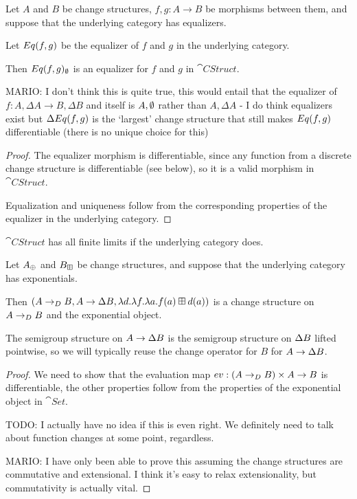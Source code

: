 \begin{prop}[Equalizers]
  Let $A$ and $B$ be change structures, $f, g: A \rightarrow B$ be morphisms
  between them, and suppose that the underlying category has equalizers.

  Let $Eq(f, g)$ be the equalizer of $f$ and $g$ in the underlying category.

  Then $Eq(f, g)_\emptyset$ is an equalizer for $f$ and $g$
  in $\cat{CStruct}$.

  MARIO: I don't think this is quite true, this would entail that the equalizer of
  $f : A, \Delta A \rightarrow B,\Delta B$ and itself is $A, \emptyset$ rather than
  $A, \Delta A$ - I do think equalizers exist but $\Delta Eq(f, g)$ is the
  `largest' change structure that still makes $Eq(f, g)$ differentiable (there
  is no unique choice for this)
\end{prop}
\begin{proof}
  The equalizer morphism is differentiable, since any function from a discrete change
  structure is differentiable (see below), so it is a valid morphism in $\cat{CStruct}$.

  Equalization and uniqueness follow from the corresponding properties of the
  equalizer in the underlying category.
\end{proof}

\begin{thm}
  $\cat{CStruct}$ has all finite limits if the underlying category does.
\end{thm}

\begin{prop}[Exponentials]
  Let $A_\oplus$ and $B_\boxplus$ be change structures, and suppose that the
  underlying category has exponentials.

  Then $(A \rightarrow_{D} B,A
    \rightarrow \Delta B,\lambda d. \lambda f. \lambda a. f(a) \boxplus
    d(a))$ is a change structure on $A \rightarrow_{D} B$ and the exponential object.

  The semigroup structure on $A \rightarrow \Delta B$ is the semigroup
  structure on $\Delta B$ lifted pointwise, so we will typically reuse the
  change operator for $B$ for $A \rightarrow \Delta B$.
\end{prop}
\begin{proof}
  We need to show that the evaluation map $ev: (A \rightarrow_{D} B) \times A
  \rightarrow B$ is differentiable, the other properties follow from the
  properties of the exponential object in $\cat{Set}$.

  TODO: I actually have no idea if this is even right. We definitely need to
  talk about function changes at some point, regardless.

  MARIO: I have only been able to prove this assuming the change structures are
  commutative and extensional. I think it's easy to relax extensionality, but
  commutativity is actually vital.
\end{proof}

